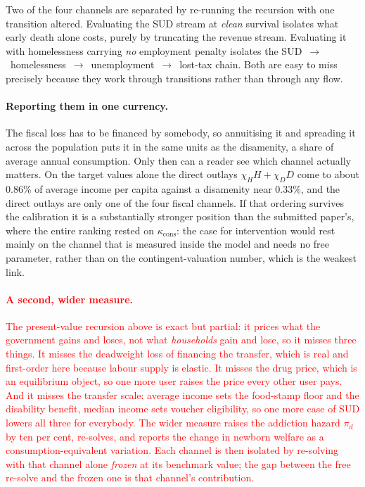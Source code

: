 \documentclass[11pt]{article}
\newcommand{\nw}[1]{\textcolor{red}{#1}}
\begin{document}
Two of the four channels are separated by re-running the recursion with one
transition altered. Evaluating the SUD stream at \emph{clean} survival isolates
what early death alone costs, purely by truncating the revenue stream. Evaluating
it with homelessness carrying \emph{no} employment penalty isolates the
SUD~$\rightarrow$~homelessness~$\rightarrow$~unemployment~$\rightarrow$~lost-tax
chain. Both are easy to miss precisely because they work through transitions
rather than through any flow.

\paragraph{Reporting them in one currency.} The fiscal loss has to be financed by
somebody, so annuitising it and spreading it across the population puts it in the
same units as the disamenity, a share of average annual consumption. Only then
can a reader see which channel actually matters. On the target values alone the
direct outlays $\chi_H H+\chi_D D$ come to about 0.86\% of average income per
capita against a disamenity near 0.33\%, and the direct outlays are only one of
the four fiscal channels. If that ordering survives the calibration it is a
substantially stronger position than the submitted paper's, where the entire
ranking rested on $\kappa_{\text{cons}}$: the case for intervention would rest
mainly on the channel that is measured inside the model and needs no free
parameter, rather than on the contingent-valuation number, which is the weakest
link.

\nw{\paragraph{A second, wider measure.} The present-value recursion above is
exact but partial: it prices what the government gains and loses, not what
\emph{households} gain and lose, so it misses three things. It misses the
deadweight loss of financing the transfer, which is real and first-order here
because labour supply is elastic. It misses the drug price, which is an
equilibrium object, so one more user raises the price every other user pays. And
it misses the transfer scale: average income sets the food-stamp floor and the
disability benefit, median income sets voucher eligibility, so one more case of
SUD lowers all three for everybody. The wider measure raises the addiction hazard
$\pi_{d}$ by ten per cent, re-solves, and reports the change in newborn welfare
as a consumption-equivalent variation. Each channel is then isolated by
re-solving with that channel alone \emph{frozen} at its benchmark value; the gap
between the free re-solve and the frozen one is that channel's contribution.}
\end{document}
